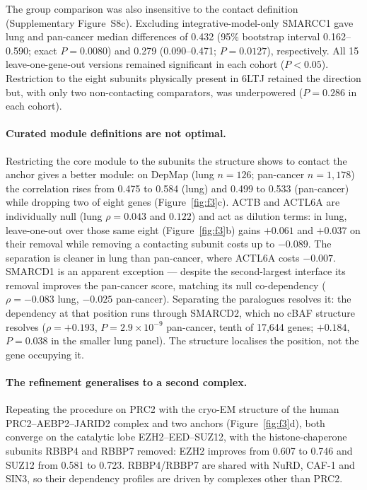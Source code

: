 \documentclass[11pt,a4paper]{article}
\begin{document}
The group comparison was also insensitive to the contact definition
(Supplementary Figure~S8c). Excluding integrative-model-only SMARCC1 gave lung
and pan-cancer median differences of 0.432 (95\% bootstrap interval
0.162--0.590; exact $P=0.0080$) and 0.279 (0.090--0.471; $P=0.0127$),
respectively. All 15 leave-one-gene-out versions remained significant in each
cohort ($P<0.05$). Restriction to the eight subunits physically present in 6LTJ
retained the direction but, with only two non-contacting comparators, was
underpowered ($P=0.286$ in each cohort).

\paragraph{Curated module definitions are not optimal.} Restricting the core
module to the subunits the structure shows to contact the anchor gives a better
module: on DepMap (lung $n = 126$; pan-cancer $n = 1{,}178$) the correlation rises
from 0.475 to 0.584 (lung) and 0.499 to 0.533 (pan-cancer) while dropping two of
eight genes (Figure~\ref{fig:f3}c). ACTB and ACTL6A are individually null (lung
$\rho = 0.043$ and $0.122$) and act as dilution terms: in lung, leave-one-out over
those same eight (Figure~\ref{fig:f3}b) gains $+0.061$ and $+0.037$ on their
removal while removing a contacting subunit costs up to $-0.089$. The separation
is cleaner in lung than pan-cancer, where ACTL6A costs $-0.007$. SMARCD1 is an apparent exception --- despite the
second-largest interface its removal improves the pan-cancer score, matching its
null co-dependency ($\rho = -0.083$ lung, $-0.025$ pan-cancer). Separating the
paralogues resolves it: the dependency at that position runs through SMARCD2,
which no cBAF structure resolves ($\rho = +0.193$, $P = 2.9\times10^{-9}$
pan-cancer, tenth of 17{,}644 genes; $+0.184$, $P = 0.038$ in the smaller lung
panel). The structure localises the position, not the gene occupying it.

\paragraph{The refinement generalises to a second complex.} Repeating the
procedure on PRC2 with the cryo-EM structure of the human PRC2--AEBP2--JARID2
complex \citep{kasinath2018,kasinath2021} and two anchors
(Figure~\ref{fig:f3}d), both converge on the catalytic lobe EZH2--EED--SUZ12,
with the histone-chaperone subunits RBBP4 and RBBP7 removed: EZH2 improves from
0.607 to 0.746 and SUZ12 from 0.581 to 0.723. RBBP4/RBBP7 are shared with NuRD,
CAF-1 and SIN3, so their dependency profiles are driven by complexes other than
PRC2.
\end{document}
